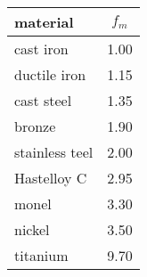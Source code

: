 \begin{tabular}{lc}
	material & $f_m$ \\ \hline
	cast iron & 1.00 \\
	ductile iron & 1.15 \\
	cast steel & 1.35 \\
	bronze & 1.90 \\
	stainless teel & 2.00 \\
	Hastelloy C & 2.95 \\
	monel & 3.30 \\
	nickel & 3.50 \\
	titanium & 9.70 \\ \hline
\end{tabular}